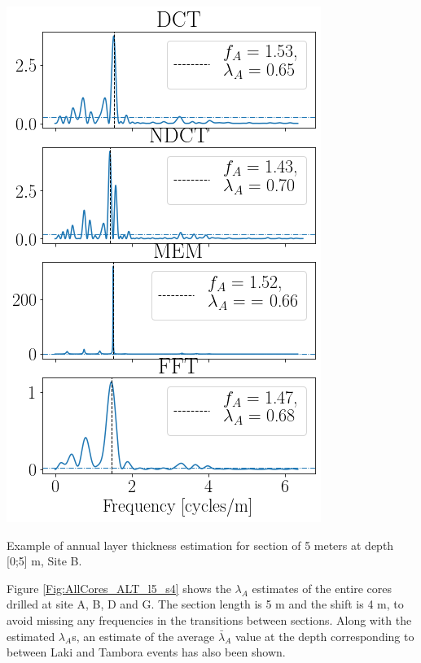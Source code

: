 \documentclass[../../CompleteThesis2/Complete_2ndDraft]{subfiles}
\begin{document}
\begin{marginfigure}
	\centering
	\includegraphics[width=\marginparwidth]{ALTestimate_example.png}
	\caption[$\lambda$ estimation example, Site B, in frequency domain.]{\footnotesize Example of annual layer thickness estimation for section of 5 meters at depth [0;5] m, Site B.}
	\label{Fig:SiteB_0-5m_ALTestimate_example}
\end{marginfigure}
%

Figure \ref{Fig:AllCores_ALT_l5_s4} shows the $\lambda_A$ estimates of the entire cores drilled at site A, B, D and G. The section length is 5 m and the shift is 4 m, to avoid missing any frequencies in the transitions between sections. Along with the estimated $\lambda_A$s, an estimate of the average $\bar{\lambda}_A$ value at the depth corresponding to between Laki and Tambora events has also been shown. 
\end{document}
